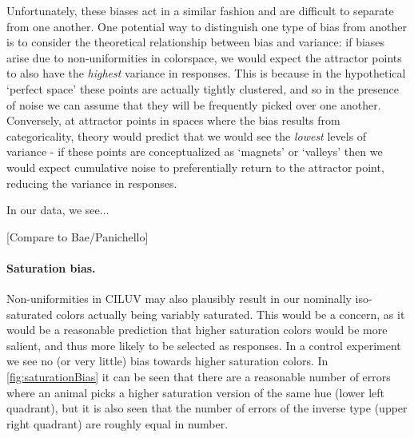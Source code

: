 Unfortunately, these biases act in a similar fashion and are difficult to separate from one another. One potential way to distinguish one type of bias from another is to consider the theoretical relationship between bias and variance: if biases arise due to non-uniformities in colorspace, we would expect the attractor points to also have the \emph{highest} variance in responses. This is because in the hypothetical `perfect space' these points are actually tightly clustered, and so in the presence of noise we can assume that they will be frequently picked over one another. Conversely, at attractor points in spaces where the bias results from categoricality, theory would predict that we would see the \emph{lowest} levels of variance - if these points are conceptualized as `magnets' or `valleys' then we would expect cumulative noise to preferentially return to the attractor point, reducing the variance in responses.

In our data, we see...

[Compare to Bae/Panichello]

\begin{figure}

\caption{\textbf{}}
\label{fig:SamplingBias}
\end{figure}
\paragraph{Saturation bias.}

Non-uniformities in CILUV may also plausibly result in our nominally iso-saturated colors actually being variably saturated. This would be a concern, as it would be a reasonable prediction that higher saturation colors would be more salient, and thus more likely to be selected as responses. In a control experiment we see no (or very little) bias towards higher saturation colors. In \autoref{fig:saturationBias} it can be seen that there are a reasonable number of errors where an animal picks a higher saturation version of the same hue (lower left quadrant), but it is also seen that the number of errors of the inverse type (upper right quadrant) are roughly equal in number.


